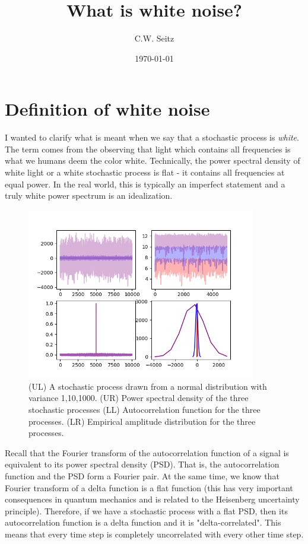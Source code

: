 \documentclass{article}
\title{What is white noise?}
\author{C.W. Seitz}
\date{\today}
\begin{document}
\maketitle

\section{Definition of white noise}

I wanted to clarify what is meant when we say that a stochastic process is \emph{white}. The term comes from the observing that light which contains all frequencies is what we humans deem the color white. Technically, the power spectral density of white light or a white stochastic process is flat - it contains all frequencies at equal power. In the real world, this is typically an imperfect statement and a truly white power spectrum is an idealization. 

\begin{figure}[H]
\centering
\includegraphics[width=10cm]{noise.png}
\caption{(UL) A stochastic process drawn from a normal distribution with variance 1,10,1000. (UR) Power spectral density of the three stochastic processes (LL) Autocorrelation function for the three processes. (LR) Empirical amplitude distribution for the three processes.}
\end{figure}

Recall that the Fourier transform of the autocorrelation function of a signal is equivalent to its power spectral density (PSD). That is, the autocorrelation function and the PSD form a Fourier pair. At the same time, we know that Fourier transform of a delta function is a flat function (this has very important consequences in quantum mechanics and is related to the Heisenberg uncertainty principle). Therefore, if we have a stochastic process with a flat PSD, then its autocorrelation function is a delta function and it is "delta-correlated". This means that every time step is completely uncorrelated with every other time step.
\end{document}
